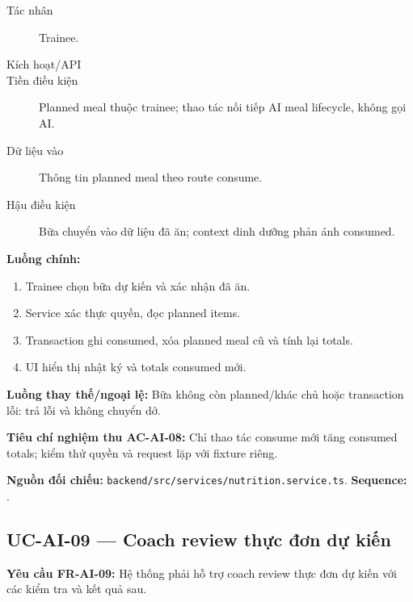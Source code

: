 \documentclass[12pt,a4paper]{article}
\newcommand{\evidence}[1]{{\small\nolinkurl{#1}}}
\begin{document}
\begin{description}
\item[Tác nhân] Trainee.
\item[Kích hoạt/API] 
\item[Tiền điều kiện] Planned meal thuộc trainee; thao tác nối tiếp AI meal lifecycle, không gọi AI.
\item[Dữ liệu vào] Thông tin planned meal theo route consume.
\item[Hậu điều kiện] Bữa chuyển vào dữ liệu đã ăn; context dinh dưỡng phản ánh consumed.
\end{description}
\textbf{Luồng chính:}
\begin{enumerate}
  \item Trainee chọn bữa dự kiến và xác nhận đã ăn.
  \item Service xác thực quyền, đọc planned items.
  \item Transaction ghi consumed, xóa planned meal cũ và tính lại totals.
  \item UI hiển thị nhật ký và totals consumed mới.
\end{enumerate}
\textbf{Luồng thay thế/ngoại lệ:} Bữa không còn planned/khác chủ hoặc transaction lỗi: trả lỗi và không chuyển dở.

\textbf{Tiêu chí nghiệm thu AC-AI-08:} Chỉ thao tác consume mới tăng consumed totals; kiểm thử quyền và request lặp với fixture riêng.

\textbf{Nguồn đối chiếu:} \evidence{backend/src/services/nutrition.service.ts}. \textbf{Sequence:} .

\subsection{UC-AI-09 --- Coach review thực đơn dự kiến}
\label{uc-ai-9}
\textbf{Yêu cầu FR-AI-09:} Hệ thống phải hỗ trợ coach review thực đơn dự kiến với các kiểm tra và kết quả sau.
\end{document}
